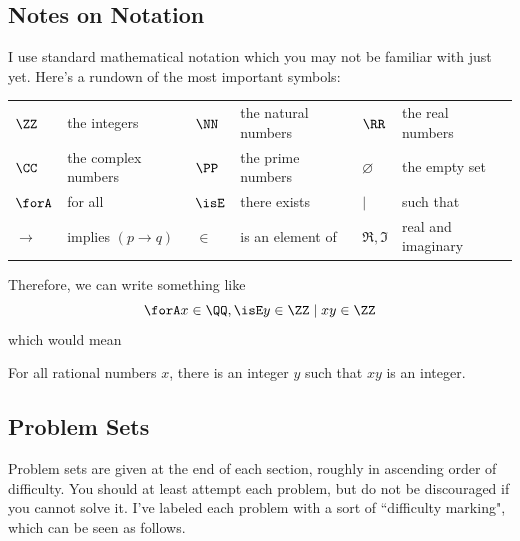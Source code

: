 \documentclass[11pt]{article}
\begin{document}
\subsection{Notes on Notation}
I use standard mathematical notation which you may not be familiar with just yet. Here's a rundown of the most important symbols:

\medskip

\begin{tabular}{l l l l l l}
	$\ZZ$ & the integers & $\NN$ & the natural numbers & $\RR$ & the real numbers \\
    $\CC$ & the complex numbers & $\PP$ & the prime numbers & $\varnothing$ & the empty set \\
    $\forA$ & for all & $\isE$ & there exists & $\mid$ & such that \\
	$\to$ & implies $(p \to q)$ & $\in$ & is an element of & $\Re, \Im$ & real and imaginary \\
\end{tabular}

\medskip

\noindent Therefore, we can write something like
\[\forA x \in \QQ, \isE y \in \ZZ \mid xy \in \ZZ\]
which would mean
\begin{center}
	For all rational numbers $x$, there is an integer $y$ such that $xy$ is an integer.
\end{center}

\subsection{Problem Sets}
Problem sets are given at the end of each section, roughly in ascending order of difficulty. You should at least attempt each problem, but do not be discouraged if you cannot solve it. I've labeled each problem with a sort of ``difficulty marking", which can be seen as follows.

\begin{center}
\end{center}
\end{document}
